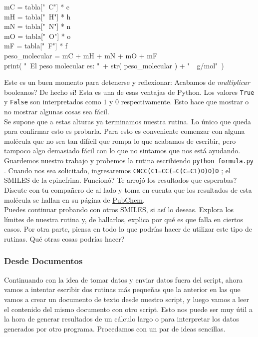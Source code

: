 \documentclass[10pt,letterpaper]{article}
\newcommand{\inlinecode}[1]{
\colorbox{light-gray}{\texttt{#1}}
}
\newenvironment{Code}
{
\begin{lrbox}{\selvestebox}%
\begin{minipage}{\dimexpr\columnwidth-2\fboxsep\relax}
\fontfamily{\ttdefault}\selectfont
}
{\end{minipage}\end{lrbox}%
\begin{center}
\colorbox{light-gray}{\usebox{\selvestebox}}
\end{center}
}
\begin{document}
\begin{Code}
mC = tabla["\ \hspace{-2mm}C"] * c\\
mH = tabla["\ \hspace{-2mm}H"] * h\\
mN = tabla["\ \hspace{-2mm}N"] * n\\
mO = tabla["\ \hspace{-2mm}O"] * o\\
mF = tabla["\ \hspace{-2mm}F"] * f\\
peso\_molecular = mC + mH + mN + mO + mF\\
print( "\ \hspace{-2mm}El peso molecular es: "\ + str( peso\_molecular ) + "\ \hspace{-2mm}\ g/mol"\ )
\end{Code}

Este es un buen momento para detenerse y reflexionar: Acabamos de \emph{multiplicar} booleanos? De hecho s\'i! Esta es una de esas ventajas de Python. Los valores \inlinecode{True} y \inlinecode{False} son interpretados como $1$ y $0$ respectivamente. Esto hace que mostrar o no mostrar algunas cosas sea f\'acil.\\

Se supone que a estas alturas ya terminamos nuestra rutina. Lo \'unico que queda para confirmar esto es probarla. Para esto es conveniente comenzar con alguna mol\'ecula que no sea tan dif\'icil que rompa lo que acabamos de escribir, pero tampoco algo demasiado f\'acil con lo que no sintamos que nos est\'a ayudando. Guardemos nuestro trabajo y probemos la rutina escribiendo \inlinecode{python formula.py}. Cuando nos sea solicitado, ingresaremos \inlinecode{CNCC(C1=CC(=C(C=C1)O)O)O}; el SMILES de la epinefrina. Funcion\'o? Te arroj\'o los resultados que esperabas? Discute con tu compa\~nero de al lado y toma en cuenta que los resultados de esta mol\'ecula se hallan en su p\'agina de \href{https://pubchem.ncbi.nlm.nih.gov/compound/epinephrine}{PubChem}.\\

Puedes continuar probando con otros SMILES, si as\'i lo deseas. Explora los l\'imites de nuestra rutina y, de hallarlos, explica por qu\'e es que falla en ciertos casos. Por otra parte, piensa en todo lo que podr\'ias hacer de utilizar este tipo de rutinas. Qu\'e otras cosas podr\'ias hacer?

\subsubsection{Desde Documentos}
Continuando con la idea de tomar datos y enviar datos fuera del script, ahora vamos a intentar escribir dos rutinas m\'as peque\~nas que la anterior en las que vamos a crear un documento de texto desde nuestro script, y luego vamos a leer el contenido del mismo documento con otro script. Esto nos puede ser muy \'util a la hora de generar resultados de un c\'alculo largo o para interpretar los datos generados por otro programa. Procedamos con un par de ideas sencillas.\\
\end{document}
